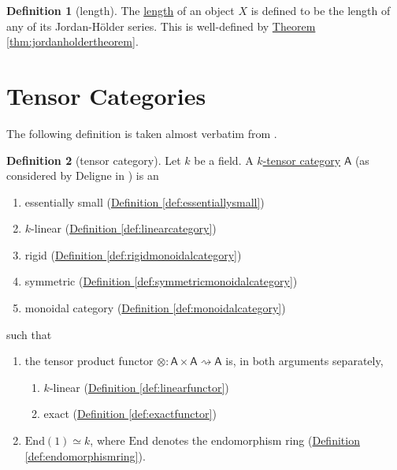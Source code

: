 \documentclass[a4paper,10pt]{scrreprt}
\newcommand{\defn}[1]{\ul{#1}}
\theoremstyle{definition}
\newtheorem{definition}{Definition}[section]
\theoremstyle{plain}
\theoremstyle{remark}
\begin{document}
\begin{definition}[length]
  \label{def:length}
  The \defn{length} of an object $X$ is defined to be the length of any of its Jordan-H{\"o}lder series. This is well-defined by \hyperref[thm:jordanholdertheorem]{Theorem \ref*{thm:jordanholdertheorem}}.
\end{definition}


\section{Tensor Categories}
The following definition is taken almost verbatim from \cite{nlab-deligne-theorem}.
\begin{definition}[tensor category]
  \label{def:tensorcategory}
  Let $k$ be a field. A \defn{$k$-tensor category} $\mathsf{A}$ (as considered by Deligne in \cite{deligne-categories-tensorielle}) is an
  \begin{enumerate}
    \item essentially small (\hyperref[def:essentiallysmall]{Definition \ref*{def:essentiallysmall}})

    \item $k$-linear (\hyperref[def:linearcategory]{Definition \ref*{def:linearcategory}})

    \item rigid (\hyperref[def:rigidmonoidalcategory]{Definition \ref*{def:rigidmonoidalcategory}})

    \item symmetric (\hyperref[def:symmetricmonoidalcategory]{Definition \ref*{def:symmetricmonoidalcategory}})

    \item monoidal category (\hyperref[def:monoidalcategory]{Definition \ref*{def:monoidalcategory}})
  \end{enumerate}
  such that 
  \begin{enumerate}
    \item the tensor product functor $\otimes\colon \mathsf{A} \times \mathsf{A} \rightsquigarrow \mathsf{A}$ is, in both arguments separately,
      \begin{enumerate}
        \item $k$-linear (\hyperref[def:linearfunctor]{Definition \ref*{def:linearfunctor}})

        \item exact (\hyperref[def:exactfunctor]{Definition \ref*{def:exactfunctor}})
      \end{enumerate}

    \item $\mathrm{End}(1) \simeq k$, where $\mathrm{End}$ denotes the endomorphism ring (\hyperref[def:endomorphismring]{Definition \ref*{def:endomorphismring}}).
  \end{enumerate}
\end{definition}
\end{document}
